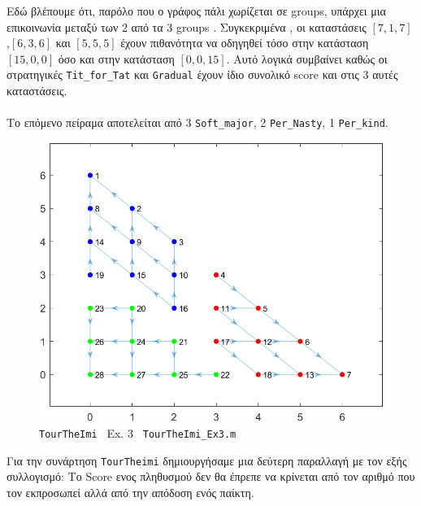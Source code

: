 Εδώ βλέπουμε ότι, παρόλο που ο γράφος πάλι χωρίζεται σε groups, υπάρχει μια επικοινωνία μεταξύ των 2 από τα 3 groups . Συγκεκριμένα , οι καταστάσεις \([7,1,7]\) ,\([6,3,6]\) και \([5,5,5]\) έχουν πιθανότητα να οδηγηθεί τόσο στην κατάσταση \([15,0,0]\) όσο και στην κατάσταση \([0,0,15]\). Αυτό λογικά συμβαίνει καθώς οι στρατηγικές \texttt{Tit\_for\_Tat} και \texttt{Gradual} έχουν ίδιο συνολικό score και στις 3 αυτές καταστάσεις.\\
\\

Το επόμενο πείραμα αποτελείται από 3 \texttt{Soft\_major}, 2 \texttt{Per\_Nasty}, 1 \texttt{Per\_kind}.
\begin{figure}[th!]
	\centering
	\includegraphics[width=0.6\linewidth]{TourTheImi_Ex3}
	\caption{\texttt{TourTheImi } Ex. 3 \texttt{ TourTheImi\_Ex3.m }}
	\label{fig:tourtheimiex3}
\end{figure}



Για την συνάρτηση \texttt{TourTheimi} δημιουργήσαμε μια δεύτερη παραλλαγή  με τον εξής συλλογισμό: Το Score ενος πληθυσμού δεν θα έπρεπε να κρίνεται από τον αριθμό που τον εκπροσωπεί αλλά από την απόδοση ενός παίκτη.



